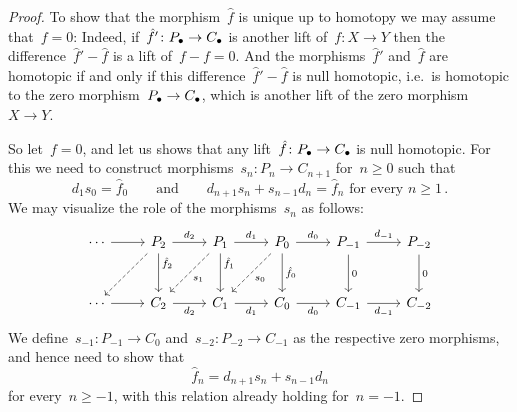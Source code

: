 \begin{proof}
  To show that the morphism~$\hat{f}$ is unique up to homotopy we may assume that~$f = 0$:
  Indeed, if~$\hat{f}' \colon P_\bullet \to C_\bullet$ is another lift of~$f \colon X \to Y$ then the difference~$\hat{f}' - \hat{f}$ is a lift of~$f - f = 0$.
  And the morphisms~$\hat{f}'$ and~$\hat{f}$ are homotopic if and only if this difference~$\hat{f}' - \hat{f}$ is null homotopic, i.e.\ is homotopic to the zero morphism~$P_\bullet \to C_\bullet$, which is another lift of the zero morphism~$X \to Y$.
  
  So let~$f = 0$, and let us shows that any lift~$\hat{f} \colon P_\bullet \to C_\bullet$ is null homotopic.
  For this we need to construct morphisms~$s_n \colon P_n \to C_{n+1}$ for~$n \geq 0$ such that
  \[
    d_1 s_0 = \hat{f}_0
    \qquad\text{and}\qquad
    \text{$d_{n+1} s_n + s_{n-1} d_n = \hat{f}_n$ for every~$n \geq 1$} \,.
  \]
  We may visualize the role of the morphisms~$s_n$ as follows:
  \[
    \begin{tikzcd}[row sep = large]
        \dotsb
        \arrow{r}
      & P_2
        \arrow{r}[above]{d_2}
        \arrow{d}[right, near start]{\hat{f}_2}
        \arrow[dashed]{dl}
      & P_1
        \arrow{r}[above]{d_1}
        \arrow{d}[right, near start]{\hat{f}_1}
        \arrow[dashed]{dl}[below right]{s_1}
      & P_0
        \arrow{r}[above]{d_0}
        \arrow{d}[right]{\hat{f}_0}
        \arrow[dashed]{dl}[below right]{s_0}
      & P_{-1}
        \arrow{r}{d_{-1}}
        \arrow{d}[right]{0}
      & P_{-2}
        \arrow{d}[right]{0}
      \\
        \dotsb
        \arrow{r}
      & C_2
        \arrow{r}[below]{d_2}
      & C_1
        \arrow{r}[below]{d_1}
      & C_0
        \arrow{r}[below]{d_0}
      & C_{-1}
        \arrow{r}[below]{d_{-1}}
      & C_{-2}
    \end{tikzcd}
  \]
  We define~$s_{-1} \colon P_{-1} \to C_0$ and~$s_{-2} \colon P_{-2} \to C_{-1}$ as the respective zero morphisms, and hence need to show that
  \[
      \hat{f}_n
    = d_{n+1} s_n + s_{n-1} d_n
  \]
  for every~$n \geq -1$, with this relation already holding for~$n = -1$.
  

\end{proof}
